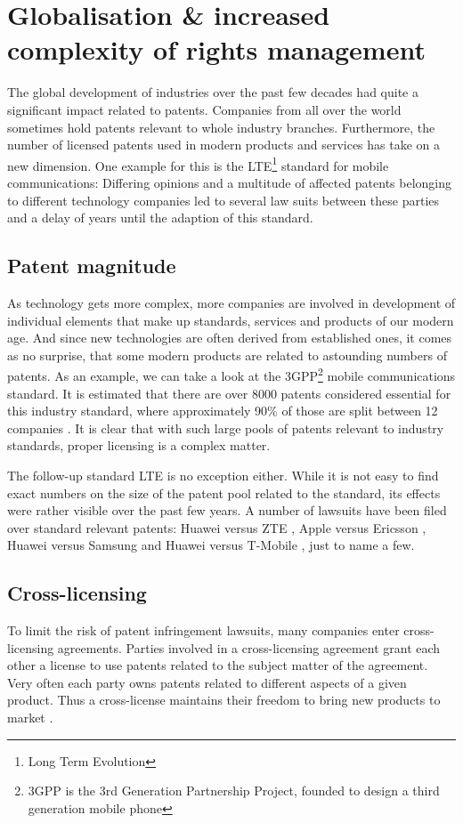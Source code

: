 \documentclass[a4paper]{report}
\begin{document}
\section{Globalisation \& increased complexity of rights management}
\label{sec:GlobalRightsMgmt}
The global development of industries over the past few decades had quite a significant impact related to patents. Companies from all over the world sometimes hold patents relevant to whole industry branches. Furthermore, the number of licensed patents used in modern products and services has take on a new dimension. One example for this is the LTE\footnote{Long Term Evolution} standard for mobile communications: Differing opinions and a multitude of affected patents belonging to different technology companies led to several law suits between these parties and a delay of years until the adaption of this standard.

\subsection{Patent magnitude}
As technology gets more complex, more companies are involved in development of individual elements that make up standards, services and products of our modern age. And since new technologies are often derived from established ones, it comes as no surprise, that some modern products are related to astounding numbers of patents. As an example, we can take a look at the 3GPP\footnote{3GPP is the 3rd Generation Partnership Project, founded to design a third generation mobile phone} mobile communications standard. It is estimated that there are over 8000 patents considered essential for this industry standard, where approximately 90\% of those are split between 12 companies \parencite{Wiki3G}. It is clear that with such large pools of patents relevant to industry standards, proper licensing is a complex matter.

The follow-up standard LTE is no exception either. While it is not easy to find exact numbers on the size of the patent pool related to the standard, its effects were rather visible over the past few years. A number of lawsuits have been filed over standard relevant patents: Huawei versus ZTE \parencite{HuaweiVsZTE}, Apple versus Ericsson \parencite{AppleVsEricsson}, Huawei versus Samsung \parencite{HuaweiVsSamsung} and Huawei versus T-Mobile \parencite{HuaweiVsTmobile}, just to name a few.

\subsection{Cross-licensing}
To limit the risk of patent infringement lawsuits, many companies enter cross-licensing agreements. Parties involved in a cross-licensing agreement grant each other a license to use patents related to the subject matter of the agreement. Very often each party owns patents related to different aspects of a given product. Thus a cross-license maintains their freedom to bring new products to market \parencite{CrossLicense}.
\end{document}
